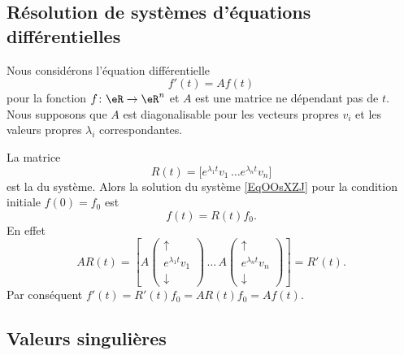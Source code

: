 \subsection{Résolution de systèmes d'équations différentielles}

Nous considérons l'équation différentielle
\begin{equation}    \label{EqOOsXZJ}
    f'(t)=Af(t)
\end{equation}
pour la fonction \( f\colon \eR\to \eR^n\) et \( A\) est une matrice ne dépendant pas de \( t\). Nous supposons que \( A\) est diagonalisable pour les vecteurs propres \( v_i\) et les valeurs propres \( \lambda_i\) correspondantes.

La matrice 
\begin{equation}
    R(t)=\big[  e^{\lambda_1t}v_1\, \ldots  e^{\lambda_nt}v_n \big]
\end{equation}
est la  du système. Alors la solution du système \eqref{EqOOsXZJ} pour la condition initiale \( f(0)=f_0\) est 
\begin{equation}
    f(t)=R(t)f_0.
\end{equation}
En effet
\begin{equation}
    AR(t)=\left[  A\begin{pmatrix}
        \uparrow    \\ 
        e^{\lambda_1t}v_1    \\ 
        \downarrow    
    \end{pmatrix}\,\ldots\,A\begin{pmatrix}
        \uparrow    \\ 
        e^{\lambda_nt}v_n    \\ 
            \downarrow
    \end{pmatrix}\right]=R'(t).
\end{equation}
Par conséquent \( f'(t)=R'(t)f_0=AR(t)f_0=Af(t)\).

\subsection{Valeurs singulières}

